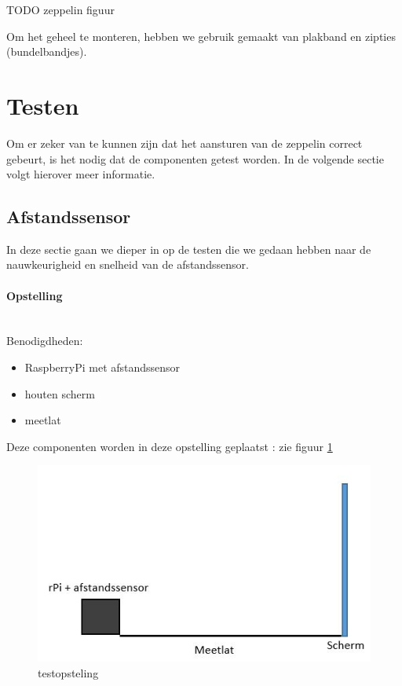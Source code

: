 \documentclass[eind]{penoverslag}
\begin{document}
TODO zeppelin figuur

Om het geheel te monteren, hebben we gebruik gemaakt van plakband en zipties (bundelbandjes). 



\section{Testen}

Om er zeker van te kunnen zijn dat het aansturen van de zeppelin correct gebeurt, is het nodig dat de componenten getest worden. In de volgende sectie volgt hierover meer informatie. \\
\subsection{Afstandssensor}

In deze sectie gaan we dieper in op de testen die we gedaan hebben naar de nauwkeurigheid en snelheid van de afstandssensor.

\paragraph{Opstelling} ~\\ 
Benodigdheden:
\begin{itemize}
	\item RaspberryPi met afstandssensor
	\item houten scherm
	\item meetlat
\end{itemize}
Deze componenten worden in deze opstelling geplaatst : zie figuur \ref{opstelling}

\begin{figure}[ht!]%
\centering
\includegraphics[scale=0.6]{opstelling.jpg}%
\caption{testopsteling}%
\label{opstelling}%
\end{figure}
\end{document}
